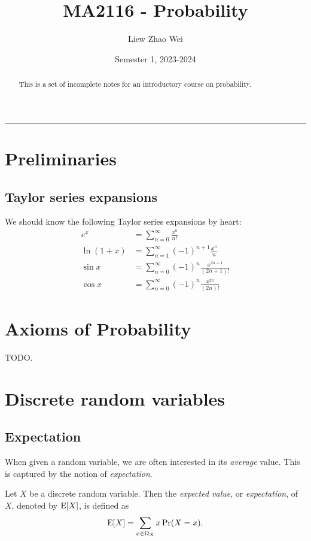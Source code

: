 \documentclass{article}
\title{MA2116 - Probability}
\author{Liew Zhao Wei}
\date{Semester 1, 2023-2024}
\begin{document}
\maketitle

\begin{abstract}
  This is a set of incomplete notes for an introductory course on probability.
\end{abstract}

\hrule

\section{Preliminaries}

\subsection{Taylor series expansions}

We should know the following Taylor series expansions by heart:
\begin{align*}
  e^x        & = \sum\limits_{n = 0}^\infty \frac{x^n}{n!}
  \\
  \ln(1 + x) & = \sum\limits_{n = 1}^\infty (-1)^{n + 1} \frac{x^n}{n}
  \\
  \sin x     & = \sum\limits_{n = 0}^\infty (-1)^n \frac{x^{2n + 1}}{(2n + 1)!}
  \\
  \cos x     & = \sum\limits_{n = 0}^\infty (-1)^n \frac{x^{2n}}{(2n)!}
\end{align*}

\section{Axioms of Probability}

TODO.

\section{Discrete random variables}

\subsection{Expectation}

When given a random variable, we are often interested in its \emph{average} value.
This is captured by the notion of \emph{expectation}.

\begin{definition}
  Let $X$ be a discrete random variable.
  Then the \emph{expected value}, or \emph{expectation}, of $X$, denoted by $\operatorname{E}[X]$, is defined as
  \[
    \operatorname{E}[X] = \sum_{x \in \Omega_X} x \Pr(X = x).
  \]
\end{definition}
\end{document}
